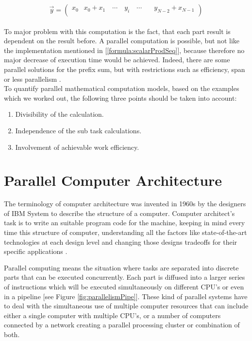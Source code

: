 \begin{equation} \label{formula:prefixSumNonFormal}
	\vec{y} = \begin{pmatrix}
		x_{0} & x_{0} + x_{1} \quad \cdots \quad y_{i} \quad \cdots \quad & y_{N - 2} + x_{N-1} \\
	\end{pmatrix}
\end{equation}
\\[2pt]
To major problem with this computation is the fact, that each part result is dependent on the result before. A parallel computation is possible, but not like the implementation mentioned in [\ref{formula:scalarProdSeq}], because therefore no major decrease of execution time would be achieved. Indeed, there are some parallel solutions for the prefix sum, but with restrictions such as efficiency, span \parencite{article21} or less parallelism \parencite{article22}.\\

\noindent To quantify parallel mathematical computation models, based on the examples which we worked out, the following three points should be taken into account:

\begin{enumerate}
	\item Divisibility of the calculation.
	\item Independence of the sub task calculations.
	\item Involvement of achievable work efficiency. 
\end{enumerate}

\newpage

\section{Parallel Computer Architecture}\label{chap:parallelCompArch}

The terminology of computer architecture was invented in 1960s by the designers of IBM System to describe the structure of a computer. Computer architect’s task is to write an suitable program code for the machine, keeping in mind every time this structure of computer, understanding all the factors like state-of-the-art technologies at each design level and changing those designs tradeoffs for their specific applications \parencite{article20}.

Parallel computing means the situation where tasks are separated into discrete parts that can be executed concurrently. Each part is diffused into a larger series of instructions which will be executed simultaneously on different CPU's or even in a pipeline [see Figure \ref{fig:parallelismPipe}]. These kind of parallel systems have to deal with the simultaneous use of multiple computer resources that can include either a single computer with multiple CPU's, or a number of computers connected by a network creating a parallel processing cluster or combination of both.

